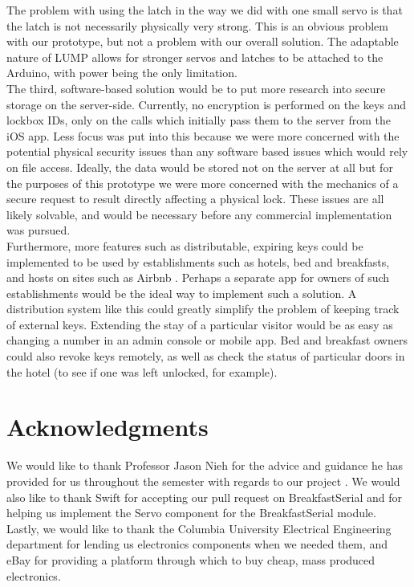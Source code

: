 \documentclass[10pt]{article}
\begin{document}
\begin{multicols}{2}
The problem with using the latch in the way we did with one small servo is that the latch is not necessarily physically very strong. This is an obvious problem with our prototype, but not a problem with our overall solution. The adaptable nature of LUMP allows for stronger servos and latches to be attached to the Arduino, with power being the only limitation.\\

The third, software-based solution would be to put more research into secure storage on the server-side. Currently, no encryption is performed on the keys and lockbox IDs, only on the calls which initially pass them to the server from the iOS app. Less focus was put into this because we were more concerned with the potential physical security issues than any software based issues which would rely on file access. Ideally, the data would be stored not on the server at all but for the purposes of this prototype we were more concerned with the mechanics of a secure request to result directly affecting a physical lock. These issues are all likely solvable, and would be necessary before any commercial implementation was pursued.\\

Furthermore, more features such as distributable, expiring keys could be implemented to be used by establishments such as hotels, bed and breakfasts, and hosts on sites such as Airbnb \cite{airbnb}. Perhaps a separate app for owners of such establishments would be the ideal way to implement such a solution. A distribution system like this could greatly simplify the problem of keeping track of external keys. Extending the stay of a particular visitor would be as easy as changing a number in an admin console or mobile app. Bed and breakfast owners could also revoke keys remotely, as well as check the status of particular doors in the hotel (to see if one was left unlocked, for example).\\


\section{Acknowledgments}
We would like to thank Professor Jason Nieh for the advice and guidance he has provided for us throughout the semester with regards to our project \cite{nieh}. We would also like to thank Swift \cite{swift} for accepting our pull request on BreakfastSerial and for helping us implement the Servo component for the BreakfastSerial module. Lastly, we would like to thank the Columbia University Electrical Engineering department for lending us electronics components when we needed them, and eBay for providing a platform through which to buy cheap, mass produced electronics. 




\end{multicols}
\end{document}
